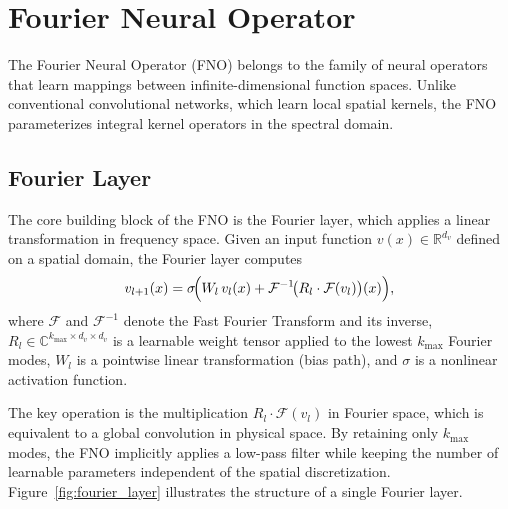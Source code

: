 \section{Fourier Neural Operator}
\label{sec:fno}

The Fourier Neural Operator (FNO) \parencite{li_fourier_2021} belongs to the family
of neural operators that learn mappings between infinite-dimensional function
spaces. Unlike conventional convolutional networks, which learn local spatial
kernels, the FNO parameterizes integral kernel operators in the spectral
domain.

\subsection{Fourier Layer}

The core building block of the FNO is the Fourier layer, which applies a
linear transformation in frequency space. Given an input function
$v(x) \in \mathbb{R}^{d_v}$ defined on a spatial domain, the Fourier layer
computes
\begin{equation}
\label{eq:fourier_layer}
v_{l+1}(x) = \sigma\!\Bigl(W_l\, v_l(x) + \mathcal{F}^{-1}\!\bigl(R_l \cdot \mathcal{F}(v_l)\bigr)(x)\Bigr),
\end{equation}
where $\mathcal{F}$ and $\mathcal{F}^{-1}$ denote the Fast Fourier Transform
and its inverse, $R_l \in \mathbb{C}^{k_{\max} \times d_v \times d_v}$ is a
learnable weight tensor applied to the lowest $k_{\max}$ Fourier modes, $W_l$
is a pointwise linear transformation (bias path), and $\sigma$ is a nonlinear
activation function.

The key operation is the multiplication $R_l \cdot \mathcal{F}(v_l)$ in
Fourier space, which is equivalent to a global convolution in physical space.
By retaining only $k_{\max}$ modes, the FNO implicitly applies a low-pass
filter while keeping the number of learnable parameters independent of the
spatial discretization. Figure~\ref{fig:fourier_layer} illustrates the
structure of a single Fourier layer.

